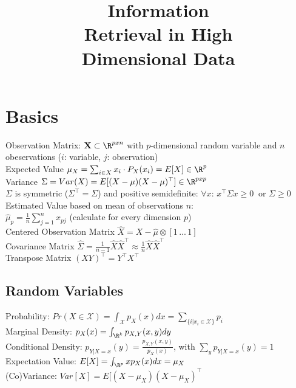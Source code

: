 \documentclass[english]{latex4ei/latex4ei_sheet}
\title{Information \\Retrieval in High\\ Dimensional Data}
\begin{document}
\maketitle	%

\section{Basics}
\begin{sectionbox}
Observation Matrix: $\mathbf{X} \subset \R^{pxn}$ with $p$-dimensional random variable and $n$ obeservations ($i$: variable, $j$: observation)\\
Expected Value $\mu_X=\sum_{i\in X} x_i\cdot P_X(x_i)=E[X]\in\R^p$ \\
Variance $\Sigma=Var(X)=E[(X-\mu)(X-\mu)^{\top}]\in\R^{pxp}$\\
$\Sigma$ is symmetric ($\Sigma^{\top} = \Sigma$) and positive semidefinite: $\forall x$: $x^{\top}\Sigma x \ge 0\ $ or $\Sigma \ge 0$\\
Estimated Value based on mean of observations $n$: \\ $\hat{\mu}_p=\frac{1}{n}\sum_{j=1}^nx_{pj}$ (calculate for every dimension $p$)\\
Centered Observation Matrix $\hat{X}=X-\hat{\mu}\otimes [1\,...\,1]$ \\
Covariance Matrix $\hat{\Sigma}=\frac{1}{n-1}\hat{X}\hat{X}^{\top}\approx \frac{1}{n}\hat{X}\hat{X}^{\top}$ \\
Transpose Matrix $(XY)^{\top}=Y^{\top}X^{\top}$\\
\subsection{Random Variables}
Probability: $Pr(X\in\mathcal{X})=\int_\mathcal{X}p_X(x)dx=\sum_{\{i|x_i\in\mathcal{X}\}}p_i$\\
Marginal Density: $p_X(x)=\int_{\R^k}p_{X,Y}(x,y)dy$\\
Conditional Density: $p_{Y|X=x}(y)=\frac{p_{X,Y}(x,y)}{p_X(x)}$, with $\sum_{y}p_{Y|X=x}(y)=1$ \\
Expectation Value: $E[X]=\int_{\R^p}xp_X(x)dx=\mu_X$\\
(Co)Variance: $Var[X]=E[(X-\mu_X)(X-\mu_X)^{\top}$
\end{sectionbox}
\end{document}
